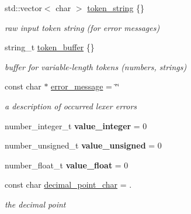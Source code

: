 \begin{DoxyCompactItemize}
\mbox{\label{classnlohmann_1_1detail_1_1lexer_ad2960e3d54af8fb8d572a8f6f7731d62}} 
std\+::vector$<$ char $>$ \mbox{\hyperlink{classnlohmann_1_1detail_1_1lexer_ad2960e3d54af8fb8d572a8f6f7731d62}{token\+\_\+string}} \{\}
\begin{DoxyCompactList}\small\item\em raw input token string (for error messages) \end{DoxyCompactList}\item 
\mbox{\label{classnlohmann_1_1detail_1_1lexer_a8f43746570e5cadbc9b2b6b0c4c8e051}} 
string\+\_\+t \mbox{\hyperlink{classnlohmann_1_1detail_1_1lexer_a8f43746570e5cadbc9b2b6b0c4c8e051}{token\+\_\+buffer}} \{\}
\begin{DoxyCompactList}\small\item\em buffer for variable-\/length tokens (numbers, strings) \end{DoxyCompactList}\item 
\mbox{\label{classnlohmann_1_1detail_1_1lexer_ae2a15e440f1889e0ab0c6a35344e48df}} 
const char $\ast$ \mbox{\hyperlink{classnlohmann_1_1detail_1_1lexer_ae2a15e440f1889e0ab0c6a35344e48df}{error\+\_\+message}} = \char`\"{}\char`\"{}
\begin{DoxyCompactList}\small\item\em a description of occurred lexer errors \end{DoxyCompactList}\item 
\mbox{\label{classnlohmann_1_1detail_1_1lexer_a353d8eeca5b2f21b3e88540c17afb9bc}} 
number\+\_\+integer\+\_\+t {\bfseries value\+\_\+integer} = 0
\item 
\mbox{\label{classnlohmann_1_1detail_1_1lexer_af250180459c23ca71c3e10a99fb5ba3e}} 
number\+\_\+unsigned\+\_\+t {\bfseries value\+\_\+unsigned} = 0
\item 
\mbox{\label{classnlohmann_1_1detail_1_1lexer_a861ce804da2d257ee373d1e0b55780e1}} 
number\+\_\+float\+\_\+t {\bfseries value\+\_\+float} = 0
\item 
\mbox{\label{classnlohmann_1_1detail_1_1lexer_a16593b0475f6d1cddd5eaf7c045771f3}} 
const char \mbox{\hyperlink{classnlohmann_1_1detail_1_1lexer_a16593b0475f6d1cddd5eaf7c045771f3}{decimal\+\_\+point\+\_\+char}} = \textquotesingle{}.\textquotesingle{}
\begin{DoxyCompactList}\small\item\em the decimal point \end{DoxyCompactList}\end{DoxyCompactItemize}



